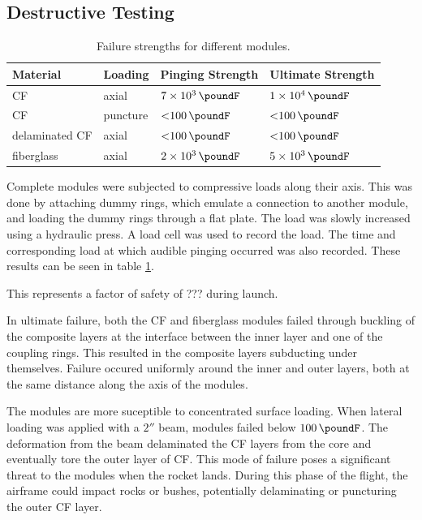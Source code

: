 \documentclass{aiaa-tc}%
\begin{document}
\subsection{Destructive Testing}

\begin{table}
	\centering
	\caption{Failure strengths for different modules.}\label{tab:compression}
	\begin{tabular}{llll}
		Material & Loading & Pinging Strength & Ultimate Strength\\
		\hline
		CF 		& axial 	& $\SI{7e3}{\poundF}$ 	& $\SI{1e4}{\poundF}$ \\
		CF 		& puncture 	& $\SI{<100}{\poundF}$	& $\SI{<100}{\poundF}$\\
		delaminated CF 	& axial 	& $\SI{<100}{\poundF}$	& $\SI{<100}{\poundF}$\\
		fiberglass 	& axial 	& $\SI{2e3}{\poundF}$ 	& $\SI{5e3}{\poundF}$ \\
	\end{tabular}
\end{table}

Complete modules were subjected to compressive loads along their axis. This was done by attaching dummy rings, which emulate a connection to another module, and loading the dummy rings through a flat plate. 
The load was slowly increased using a hydraulic press. 
A load cell was used to record the load. The time and corresponding load at which audible pinging occurred was also recorded.
These results can be seen in table \ref{tab:compression}.

This represents a factor of safety of ???
during launch.

In ultimate failure, both the CF and fiberglass modules failed through buckling of the composite layers at the interface between the inner layer and one of the coupling rings.
This resulted in the composite layers subducting under themselves.
Failure occured uniformly around the inner and outer layers, both at the same distance along the axis of the modules. 

The modules are more suceptible to concentrated surface loading. 
When lateral loading was applied with a $2''$ beam, modules failed below $\SI{100}{\poundF}$. 
The deformation from the beam delaminated the CF layers from the core and eventually tore the outer layer of CF. 
This mode of failure poses a significant threat to the modules when the rocket lands. 
During this phase of the flight, the airframe could impact rocks or bushes, potentially delaminating or puncturing the outer CF layer. 
\end{document}

